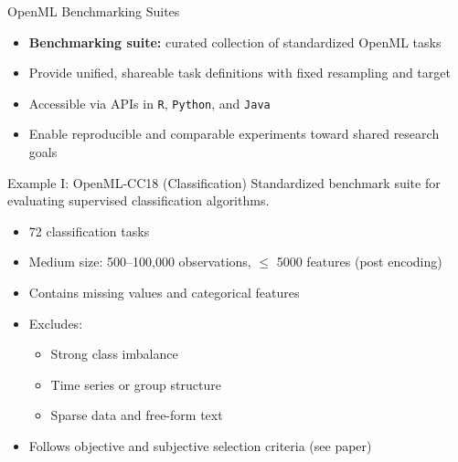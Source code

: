 \documentclass[11pt,compress,t,notes=noshow, aspectratio=169, xcolor=table]{beamer}
\begin{document}
\begin{vbframe}{OpenML Benchmarking Suites}
\vfill
\begin{itemize}
    \item \textbf{Benchmarking suite:} curated collection of standardized OpenML tasks
    \item Provide unified, shareable task definitions with fixed resampling and target
    \item Accessible via APIs in \texttt{R}, \texttt{Python}, and \texttt{Java}
    \item Enable reproducible and comparable experiments toward shared research goals
\end{itemize}
\vfill
\end{vbframe}

\begin{vbframe}{Example I: OpenML-CC18 (Classification)}
\vfill
Standardized benchmark suite for evaluating supervised classification algorithms.
\vspace{0.5em}
\begin{itemize}
    \item 72 classification tasks
    \item Medium size: 500–100,000 observations, $\leq$ 5000 features (post encoding)
    \item Contains missing values and categorical features
    \item Excludes:
    \begin{itemize}
        \item Strong class imbalance
        \item Time series or group structure
        \item Sparse data and free-form text
    \end{itemize}
    \item Follows objective and subjective selection criteria (see paper)
\end{itemize}
\vfill
\end{vbframe}
\end{document}
